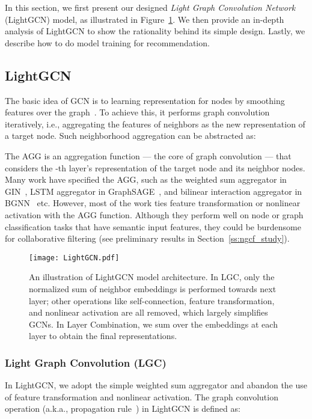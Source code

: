 \documentclass[sigconf]{acmart}
\theoremstyle{definition}
\begin{document}
In this section, we first present our designed \textit{Light Graph Convolution Network} (LightGCN) model, as illustrated in Figure~\ref{fig:LightGCN}.
We then provide an in-depth analysis of LightGCN to show the rationality behind its simple design. 
Lastly, we describe how to do model training for recommendation. 

\subsection{LightGCN}
The basic idea of GCN is to learning representation for nodes by smoothing features over the graph~\cite{GCN,SGCN}. 
To achieve this, it performs graph convolution iteratively, i.e., aggregating the features of neighbors as the new representation of a target node. 
Such neighborhood aggregation can be abstracted as:

The AGG is an aggregation function --- the core of graph convolution --- that considers the -th layer's representation of the target node and its neighbor nodes. Many work have specified the AGG, such as the weighted sum aggregator in GIN~\cite{GIN}, LSTM aggregator in GraphSAGE~\cite{GraphSAGE}, and bilinear interaction aggregator in BGNN~\cite{BGNN} etc. However, most of the work ties feature transformation or nonlinear activation with the AGG function. Although they perform well on node or graph classification tasks that have semantic input features, they could be burdensome for collaborative filtering (see preliminary results in Section~\ref{ss:ngcf_study}).

\begin{figure}[t]
\centering
	\small	
	\texttt{[image: LightGCN.pdf]}\vspace{-5pt}
	\caption{An illustration of LightGCN model architecture. 
In LGC, only the normalized sum of neighbor embeddings is performed towards next layer; other operations like self-connection, feature transformation, and nonlinear activation are all removed, which largely simplifies GCNs. In Layer Combination, we sum over the embeddings at each layer to obtain the final representations.}\vspace{-10pt}
	\label{fig:LightGCN}
\end{figure}

\subsubsection{Light Graph Convolution (LGC)}
In LightGCN, we adopt the simple weighted sum aggregator and abandon the use of feature transformation and nonlinear activation. The graph convolution operation (a.k.a., propagation rule~\cite{NGCF}) in LightGCN is defined as:
\end{document}
